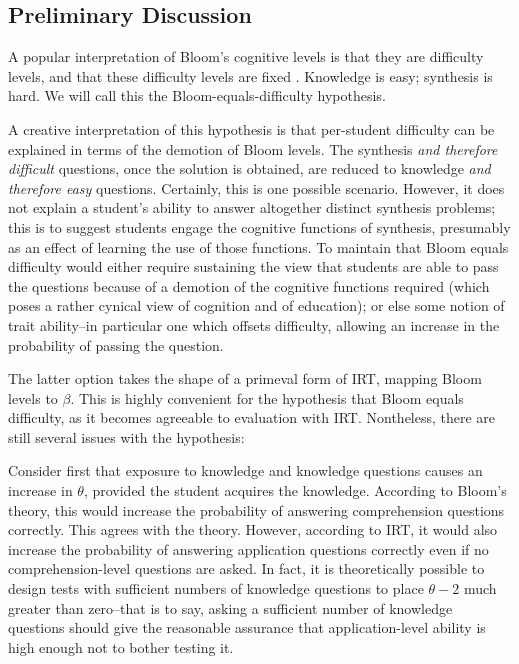 \documentclass[]{interact}
\theoremstyle{plain}
\theoremstyle{definition}
\theoremstyle{remark}
\begin{document}
\subsection{Preliminary Discussion}

A popular interpretation of Bloom's cognitive levels is that they are
difficulty levels, and that these difficulty levels are fixed
\citep{newman1988effect,oliver2004course,lord2007moving,
johnson2006bloom,fuller2007developing}.  Knowledge is easy; synthesis is hard.
We will call this the Bloom-equals-difficulty hypothesis.

A creative interpretation of this hypothesis is that per-student difficulty can
be explained in terms of the demotion of Bloom levels.  The synthesis \emph{and
therefore difficult} questions, once the solution is obtained, are reduced to
knowledge \emph{and therefore easy} questions.  Certainly, this is one possible
scenario.  However, it does not explain a student's ability to answer
altogether distinct synthesis problems; this is to suggest students engage the
cognitive functions of synthesis, presumably as an effect of learning the use
of those functions.  To maintain that Bloom equals difficulty would either
require sustaining the view that students are able to pass the questions
because of a demotion of the cognitive functions required (which poses a rather
cynical view of cognition and of education); or else some notion of trait
ability--in particular one which offsets difficulty, allowing an increase in
the probability of passing the question.

The latter option takes the shape of a primeval form of IRT, mapping Bloom
levels to $\beta$.  This is highly convenient for the hypothesis that Bloom
equals difficulty, as it becomes agreeable to evaluation with IRT.  Nontheless,
there are still several issues with the hypothesis:



Consider first that exposure to knowledge and knowledge questions causes an
increase in $\theta$, provided the student acquires the knowledge.  According
to Bloom's theory, this would increase the probability of answering
comprehension questions correctly.  This agrees with the theory.  However,
according to IRT, it would also increase the probability of answering
application questions correctly even if no comprehension-level questions are
asked.  In fact, it is theoretically possible to design tests with sufficient
numbers of knowledge questions to place $\theta-2$ much greater than zero--that
is to say, asking a sufficient number of knowledge questions should give the
reasonable assurance that application-level ability is high enough not to
bother testing it.
\end{document}
